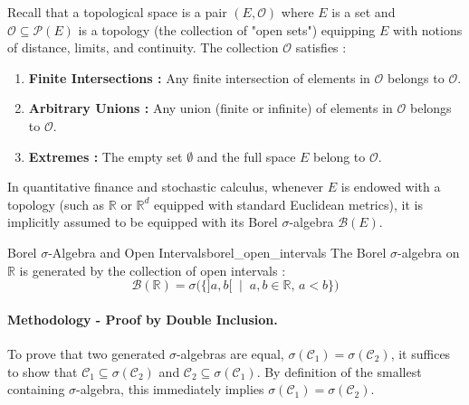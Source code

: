 \begin{insight}
Recall that a topological space is a pair $(E, \mathcal{O})$ where $E$ is a set and $\mathcal{O} \subseteq \mathcal{P}(E)$ is a topology (the collection of "open sets") equipping $E$ with notions of distance, limits, and continuity. The collection $\mathcal{O}$ satisfies :
\begin{enumerate}[label=(\roman*)]
    \item \textbf{Finite Intersections :} Any finite intersection of elements in $\mathcal{O}$ belongs to $\mathcal{O}$.
    \item \textbf{Arbitrary Unions :} Any union (finite or infinite) of elements in $\mathcal{O}$ belongs to $\mathcal{O}$.
    \item \textbf{Extremes :} The empty set $\emptyset$ and the full space $E$ belong to $\mathcal{O}$.
\end{enumerate}
In quantitative finance and stochastic calculus, whenever $E$ is endowed with a topology (such as $\mathbb{R}$ or $\mathbb{R}^d$ equipped with standard Euclidean metrics), it is implicitly assumed to be equipped with its Borel $\sigma$-algebra $\mathcal{B}(E)$.
\end{insight}


\begin{example}{Borel $\sigma$-Algebra and Open Intervals}{borel_open_intervals}
The Borel $\sigma$-algebra on $\mathbb{R}$ is generated by the collection of open intervals :
\[
    \mathcal{B}(\mathbb{R}) = \sigma\Big( \big\{ ]a, b[ \;\mid\; a, b \in \mathbb{R},\, a < b \big\} \Big)
\]
\end{example}

\paragraph{Methodology - Proof by Double Inclusion.}
To prove that two generated $\sigma$-algebras are equal, $\sigma(\mathcal{C}_1) = \sigma(\mathcal{C}_2)$, it suffices to show that $\mathcal{C}_1 \subseteq \sigma(\mathcal{C}_2)$ and $\mathcal{C}_2 \subseteq \sigma(\mathcal{C}_1)$. By definition of the smallest containing $\sigma$-algebra, this immediately implies $\sigma(\mathcal{C}_1) = \sigma(\mathcal{C}_2)$.

